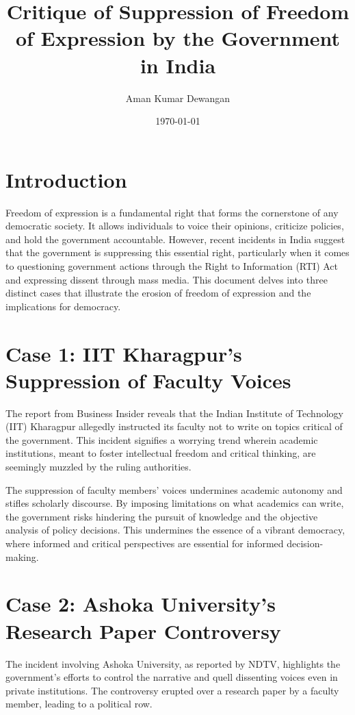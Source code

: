 \documentclass{article}
\begin{document}
	
	\title{Critique of Suppression of Freedom of Expression by the Government in India}
	\author{Aman Kumar Dewangan}
	\date{\today}
	
	\maketitle
	
	\section{Introduction}
	Freedom of expression is a fundamental right that forms the cornerstone of any democratic society. It allows individuals to voice their opinions, criticize policies, and hold the government accountable. However, recent incidents in India suggest that the government is suppressing this essential right, particularly when it comes to questioning government actions through the Right to Information (RTI) Act and expressing dissent through mass media. This document delves into three distinct cases that illustrate the erosion of freedom of expression and the implications for democracy.
	
	\section{Case 1: IIT Kharagpur's Suppression of Faculty Voices}
	The report from Business Insider reveals that the Indian Institute of Technology (IIT) Kharagpur allegedly instructed its faculty not to write on topics critical of the government. This incident signifies a worrying trend wherein academic institutions, meant to foster intellectual freedom and critical thinking, are seemingly muzzled by the ruling authorities.
	{\bigskip}
	
	The suppression of faculty members' voices undermines academic autonomy and stifles scholarly discourse. By imposing limitations on what academics can write, the government risks hindering the pursuit of knowledge and the objective analysis of policy decisions. This undermines the essence of a vibrant democracy, where informed and critical perspectives are essential for informed decision-making.
	
	\section{Case 2: Ashoka University's Research Paper Controversy}
	The incident involving Ashoka University, as reported by NDTV, highlights the government's efforts to control the narrative and quell dissenting voices even in private institutions. The controversy erupted over a research paper by a faculty member, leading to a political row.
	
\end{document}
